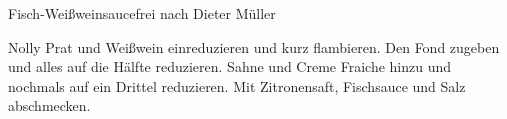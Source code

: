 \begin{recipe}{Fisch-Weißweinsauce}{frei nach Dieter Müller}
  \label{Fischsauce}
  \inglist

  \steps
  Nolly Prat und Weißwein einreduzieren und kurz flambieren. Den Fond zugeben und alles
  auf die Hälfte reduzieren. Sahne und Creme Fraiche hinzu und nochmals auf ein Drittel
  reduzieren. Mit Zitronensaft, Fischsauce und Salz abschmecken.
\end{recipe}

